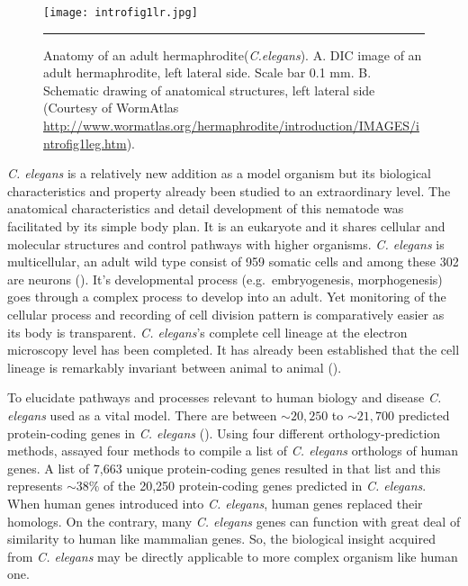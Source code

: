 \begin{figure}%
	\centering
		\texttt{[image: introfig1lr.jpg]}
		\rule{35em}{0.5pt}
	\caption[Anatomy of an adult \textit{C.elegans}]{Anatomy of an adult hermaphrodite(\textit{C.elegans}). 
	A. DIC image of an adult hermaphrodite, left lateral side. Scale bar 0.1 mm. 
	B. Schematic drawing of anatomical structures, left lateral side 
	(Courtesy of WormAtlas \url{http://www.wormatlas.org/hermaphrodite/introduction/IMAGES/introfig1leg.htm}).}
	\label{fig:anatomy}
\end{figure}

\textit{C. elegans} is a relatively new addition as a model organism but its biological characteristics and property already been studied to an extraordinary level. The anatomical characteristics and detail development of this nematode was facilitated by its simple body plan. It is an eukaryote and it shares cellular and molecular structures and control pathways with higher organisms. \textit{C. elegans} is multicellular, an adult wild type  consist of 959 somatic cells and among these 302 are neurons (\cite{Sulston:1977, Palikaras:2013}). It's developmental process (e.g.\ embryogenesis, morphogenesis) goes through a complex process to develop into an adult. Yet monitoring of the cellular process  and recording of cell division pattern is comparatively easier as its body is transparent. \textit{C. elegans}'s complete cell lineage at the electron microscopy level has been completed. It has already been established that the cell lineage is remarkably invariant between animal to animal (\cite{Brenner:1974, Byerly:1976, Sulston:1980, Wood:1988}).

To elucidate pathways and processes relevant to human biology and disease \textit{C. elegans} used as a vital model. There are between $\sim20,250$ to $\sim21,700$ predicted protein-coding genes in \textit{C. elegans} (\cite{Gerstein:2010}). Using four different orthology-prediction methods,  \cite{Shaye:2011} assayed four methods to compile a list of \textit{C. elegans} orthologs of human genes. A  list of 7,663 unique protein-coding genes resulted in that list and this represents $\sim38\%$ of the 20,250 protein-coding genes predicted in \textit{C. elegans}. When human genes introduced into \textit{C. elegans}, human genes replaced their homologs. On the contrary, many \textit{C. elegans} genes can function with great deal of similarity to human like mammalian genes. So, the biological insight acquired from \textit{C. elegans} may be directly applicable to more complex organism like human one.

